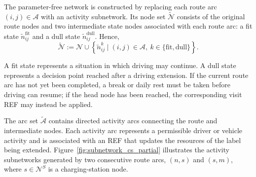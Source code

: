 \documentclass[3p,11pt,authoryear]{elsarticle}  %
\begin{document}
The parameter-free network is constructed by replacing each route arc
\((i,j)\in\mathcal{A}\) with an activity subnetwork. Its node set
\(\mathcal{\widetilde{N}}\) consists of the original route nodes and two intermediate
state nodes associated with each route arc: a fit state
\(\tilde n_{ij}^{\mathrm{fit}}\) and a dull state
\(\tilde n_{ij}^{\mathrm{dull}}\). Hence,
$$
\mathcal{\widetilde{N}}
:=
\mathcal{N}
\cup
\left\{
\tilde n_{ij}^{k}
\mid
(i,j)\in\mathcal{A},
\ k\in\{\mathrm{fit},\mathrm{dull}\}
\right\}.
$$

A fit state represents a situation in which driving may continue. A dull
state represents a decision point reached after a driving extension. If
the current route arc has not yet been completed, a break or daily rest
must be taken before driving can resume; if the head node has been
reached, the corresponding visit REF may instead be applied.

The arc set \(\mathcal{\widetilde{A}}\) contains directed activity arcs connecting
the route and intermediate nodes. Each activity arc represents a permissible
driver or vehicle activity and is associated with an REF that updates the
resources of the label being extended. Figure~\ref{fig:subnetwork_cs_partial}
illustrates the activity subnetworks generated by two consecutive route
arcs, \((n,s)\) and \((s,m)\), where
\(s\in\mathcal{N}^{S}\) is a charging-station node.







\end{document}
